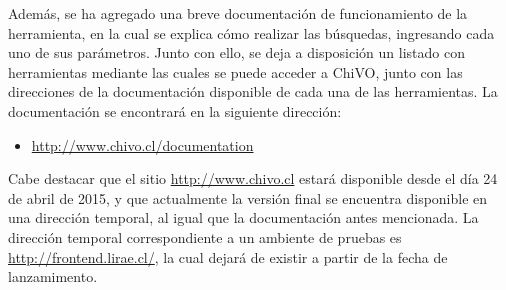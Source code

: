 Además, se ha agregado una breve documentación de funcionamiento de la herramienta, en la cual se explica cómo realizar las búsquedas, ingresando cada uno de sus parámetros. Junto con ello, se deja a disposición un listado con herramientas mediante las cuales se puede acceder a ChiVO, junto con las direcciones de la documentación disponible de cada una de las herramientas. La documentación se encontrará en la siguiente dirección:

\begin{itemize}
	\item \url{http://www.chivo.cl/documentation}
\end{itemize}

Cabe destacar que el sitio \url{http://www.chivo.cl} estará disponible desde el día 24 de abril de 2015, y que actualmente la versión final se encuentra disponible en una dirección temporal, al igual que la documentación antes mencionada. La dirección temporal correspondiente a un ambiente de pruebas es \url{http://frontend.lirae.cl/}, la cual dejará de existir a partir de la fecha de lanzamimento.
